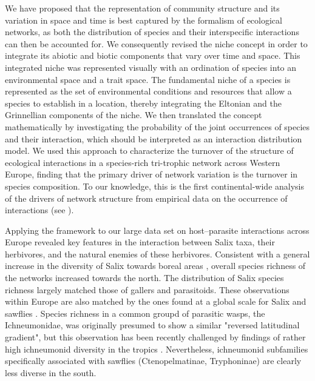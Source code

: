 \documentclass[12pt]{article}
\begin{document}
We have proposed that the representation of community structure and its
variation in space and time is best captured by the formalism of ecological
networks, as both the distribution of species and their interspecific
interactions can then be accounted for. We consequently revised the niche
concept in order to integrate its abiotic and biotic components that vary over
time and space. This integrated niche was represented visually with an
ordination of species into an environmental space and a trait space. The
fundamental niche of a species is represented as the set of environmental
conditions and resources that allow a species to establish in a location,
thereby integrating the Eltonian and the Grinnellian components of the niche.
We then translated the concept mathematically by investigating the probability
of the joint occurrences of species and their interaction, which should be
interpreted as an interaction distribution model. We used this approach to
characterize the turnover of the structure of ecological interactions in a
species-rich tri-trophic network across Western Europe, finding that the
primary driver of network variation is the turnover in species composition. To
our knowledge, this is the first continental-wide analysis of the drivers of
network structure from empirical data on the occurrence of interactions (see
\citealt{Baiser2012, Albouy2014, Poisot2016}).

Applying the framework to our large data set on host–parasite interactions
across Europe revealed key features in the interaction between Salix taxa,
their herbivores, and the natural enemies of these herbivores. Consistent with
a general increase in the diversity of Salix towards boreal areas
\citep{Cronk2015}, overall species richness of the networks increased towards
the north. The distribution of Salix species richness largely matched those of
gallers and parasitoids. These observations within Europe are also matched by
the ones found at a global scale for Salix \citep{Argus1997, Cronk2015,
Wu2015} and sawflies \citep{Kouki1994, Kouki1999}. Species richness in a
common groupd of parasitic wasps, the Ichneumonidae, was originally presumed
to show a similar "reversed latitudinal gradient", but this observation has
been recently challenged by findings of rather high ichneumonid diversity in
the tropics \citep{Veijalainen2013}. Nevertheless, ichneumonid subfamilies
specifically associated with sawflies (Ctenopelmatinae, Tryphoninae) are
clearly less diverse in the south.
\end{document}
